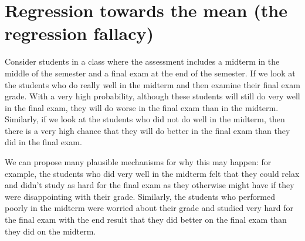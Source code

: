 %
%
%
%
%
%
%
%
%
%



\section{Regression towards the mean (the regression fallacy)}

Consider students in a class where the assessment includes a midterm in the middle of the semester and a final exam at the end of the semester. If we look at the students who do really well in the midterm and then examine their final exam grade. With a very high probability, although these students will still do very well in the final exam, they will do worse in the final exam than in the midterm. Similarly, if we look at the students who did not do well in the midterm, then there is a very high chance that they will do better in the final exam than they did in the final exam.

We can propose many plausible mechanisms for why this may happen: for example, the students who did very well in the midterm felt that they could relax and didn't study as hard for the final exam as they otherwise might have if they were disappointing with their grade. Similarly, the students who performed poorly in the midterm were worried about their grade and studied very hard for the final exam with the end result that they did better on the final exam than they did on the midterm.



